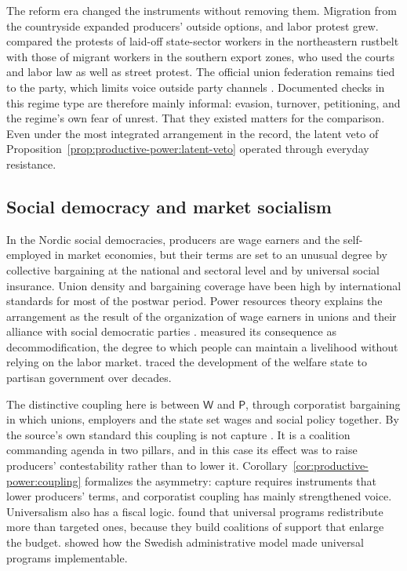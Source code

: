 \documentclass[11pt,letterpaper]{article}
\theoremstyle{definition}
\theoremstyle{remark}
\newcommand{\pP}{\mathsf{P}}
\newcommand{\pW}{\mathsf{W}}
\begin{document}
The reform era changed the instruments without removing them. Migration from the countryside expanded producers' outside options, and labor protest grew. \citet{lee2007} compared the protests of laid-off state-sector workers in the northeastern rustbelt with those of migrant workers in the southern export zones, who used the courts and labor law as well as street protest. The official union federation remains tied to the party, which limits voice outside party channels \citep{friedman2010}. Documented checks in this regime type are therefore mainly informal: evasion, turnover, petitioning, and the regime's own fear of unrest. That they existed matters for the comparison. Even under the most integrated arrangement in the record, the latent veto of Proposition~\ref{prop:productive-power:latent-veto} operated through everyday resistance.

\subsection{Social democracy and market socialism}

In the Nordic social democracies, producers are wage earners and the self-employed in market economies, but their terms are set to an unusual degree by collective bargaining at the national and sectoral level and by universal social insurance. Union density and bargaining coverage have been high by international standards for most of the postwar period. Power resources theory explains the arrangement as the result of the organization of wage earners in unions and their alliance with social democratic parties \citep{korpi1983,esping1985}. \citet{esping1990} measured its consequence as decommodification, the degree to which people can maintain a livelihood without relying on the labor market. \citet{huber2001} traced the development of the welfare state to partisan government over decades.

The distinctive coupling here is between $\pW$ and $\pP$, through corporatist bargaining in which unions, employers and the state set wages and social policy together. By the source's own standard this coupling is not capture \citep{largo2026hbs}. It is a coalition commanding agenda in two pillars, and in this case its effect was to raise producers' contestability rather than to lower it. Corollary~\ref{cor:productive-power:coupling} formalizes the asymmetry: capture requires instruments that lower producers' terms, and corporatist coupling has mainly strengthened voice. Universalism also has a fiscal logic. \citet{korpi1998} found that universal programs redistribute more than targeted ones, because they build coalitions of support that enlarge the budget. \citet{rothstein1996} showed how the Swedish administrative model made universal programs implementable.
\end{document}
